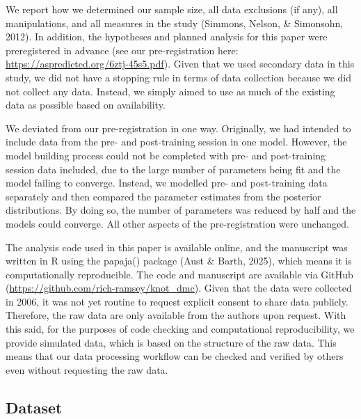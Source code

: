 \documentclass[
  english,
  man, donotrepeattitle,floatsintext]{apa6}
\begin{document}
We report how we determined our sample size, all data exclusions (if any), all manipulations, and all measures in the study (Simmons, Nelson, \& Simonsohn, 2012). In addition, the hypotheses and planned analysis for this paper were preregistered in advance (see our pre-registration here: \url{https://aspredicted.org/6ztj-45s5.pdf}). Given that we used secondary data in this study, we did not have a stopping rule in terms of data collection because we did not collect any data. Instead, we simply aimed to use as much of the existing data as possible based on availability.

We deviated from our pre-registration in one way. Originally, we had intended to include data from the pre- and post-training session in one model. However, the model building process could not be completed with pre- and post-training session data included, due to the large number of parameters being fit and the model failing to converge. Instead, we modelled pre- and post-training data separately and then compared the parameter estimates from the posterior distributions. By doing so, the number of parameters was reduced by half and the models could converge. All other aspects of the pre-registration were unchanged.

The analysis code used in this paper is available online, and the manuscript was written in R using the papaja() package (Aust \& Barth, 2025), which means it is computationally reproducible. The code and manuscript are available via GitHub (\url{https://github.com/rich-ramsey/knot_dmc}). Given that the data were collected in 2006, it was not yet routine to request explicit consent to share data publicly. Therefore, the raw data are only available from the authors upon request. With this said, for the purposes of code checking and computational reproducibility, we provide simulated data, which is based on the structure of the raw data. This means that our data processing workflow can be checked and verified by others even without requesting the raw data.

\subsection{Dataset}\label{dataset}
\end{document}
